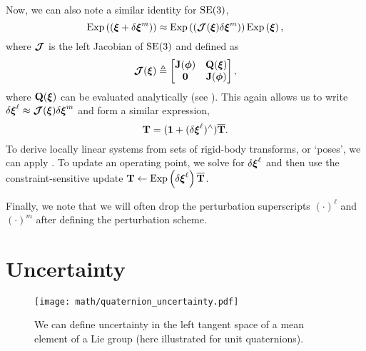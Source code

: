 \noindent Now, we can also note a similar identity for $\mathrm{SE}(3)$,
\begin{equation}
\mathrm{Exp}\left({( \boldsymbol{\mathbf{\xi}} + \delta \boldsymbol{\mathbf{\xi}}^m)}\right) \approx \mathrm{Exp}\left({(\boldsymbol{\mathbf{\mathcal{J}}}(\boldsymbol{\mathbf{\xi}}) \delta \boldsymbol{\mathbf{\xi}}^m)}\right) \mathrm{Exp}\left({\boldsymbol{\mathbf{\xi}}}\right),
\end{equation}
where $\boldsymbol{\mathbf{\mathcal{J}}}$ is the left Jacobian of $\mathrm{SE}(3)$ and defined as
\begin{equation}
\boldsymbol{\mathbf{\mathcal{J}}} (\boldsymbol{\mathbf{\xi}}) \triangleq \begin{bmatrix}  \boldsymbol{\mathbf{J}}(\boldsymbol{\mathbf{\phi}}) & \boldsymbol{\mathbf{Q}}(\boldsymbol{\mathbf{\xi}}) \\ \boldsymbol{\mathbf{0}} & \boldsymbol{\mathbf{J}}(\boldsymbol{\mathbf{\phi}}) \end{bmatrix},
\end{equation}
where $\boldsymbol{\mathbf{Q}}(\boldsymbol{\mathbf{\xi}})$ can be evaluated analytically (see \cite{Barfoot2017-ri}). This again allows us to write $\delta \boldsymbol{\mathbf{\xi}}^\ell \approx \boldsymbol{\mathbf{\mathcal{J}}}(\boldsymbol{\mathbf{\xi}}) \delta \boldsymbol{\mathbf{\xi}}^m$ and form a similar expression,
\begin{equation}
	\label{eq:math_se3_perturbations}
	\boldsymbol{\mathbf{T}} = (\boldsymbol{\mathbf{1}} + (\delta \boldsymbol{\mathbf{\xi}}^\ell)^\wedge) \overline{\boldsymbol{\mathbf{T}}}.
\end{equation}
To derive locally linear systems from sets of rigid-body transforms, or `poses', we can apply . To update an operating point, we solve for $\delta \boldsymbol{\mathbf{\xi}}^\ell$ and then use the constraint-sensitive update $\boldsymbol{\mathbf{T}} \leftarrow \mathrm{Exp}\left({\delta \boldsymbol{\mathbf{\xi}}^\ell}\right) \overline{\boldsymbol{\mathbf{T}}}$.

Finally, we note that we will often drop the perturbation superscripts $(\cdot)^\ell$ and $(\cdot)^m$ after defining the perturbation scheme.

\section{Uncertainty}


\begin{wrapfigure}{r}{0.35\textwidth}
  \vspace{-20pt}
  \begin{center}
	\texttt{[image: math/quaternion\_uncertainty.pdf]}
  \end{center}
    \vspace{-20pt}
	\label{fig:math_quat_uncertainty}
	\caption{We can define uncertainty in the left tangent space of a mean element of a Lie group (here illustrated for unit quaternions).}
\end{wrapfigure} 


